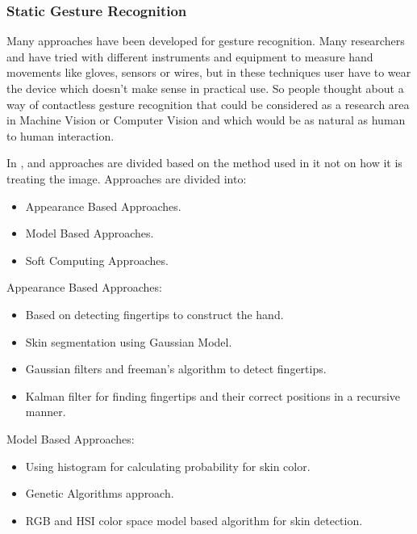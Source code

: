 \subsubsection{Static Gesture Recognition}

Many approaches have been developed for gesture recognition. Many researchers \cite{yrel7} and \cite{yrel16} have tried with different instruments and equipment to measure hand movements like gloves, sensors or wires, but in these techniques user have to wear the device which doesn’t make sense in practical use. So people thought about a way of contactless gesture recognition that could be considered as a research area in Machine Vision or Computer Vision and which would be as natural as human to human interaction.
\bigskip

In \cite{yrel1},\cite{relatedsg1} and \cite{relatedsg2}  approaches are divided based on the method used in it not on how it is treating the image. Approaches are divided into:
\begin{itemize}
\item Appearance Based Approaches.
\item Model Based Approaches.
\item Soft Computing Approaches.
\end{itemize}

\bigskip

Appearance Based Approaches:
\begin{itemize}

\item Based on detecting fingertips to construct the hand.
\item Skin segmentation using Gaussian Model.
\item Gaussian filters and freeman's algorithm to detect fingertips.
\item Kalman filter for finding fingertips and their correct positions in a recursive manner.
\end{itemize}

\bigskip

Model Based Approaches:
\begin{itemize}
\item Using histogram for calculating probability for skin color.
\item Genetic Algorithms approach.
\item RGB and HSI color space model based algorithm for skin detection.	
\end{itemize}

